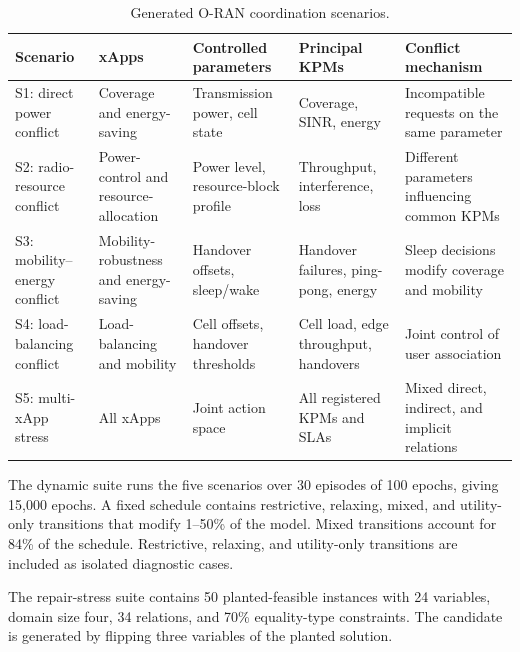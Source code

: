 \documentclass[pdflatex,sn-mathphys-num,iicol,oneside]{sn-jnl}
\begin{document}
\begin{table}[t]
\centering
\caption{Generated O-RAN coordination scenarios.}
\label{tab:scenarios}
\setlength{\tabcolsep}{4pt}
\small

\begin{tabular}{
  >{\raggedright\arraybackslash}p{18mm}
  >{\raggedright\arraybackslash}p{27mm}
  >{\raggedright\arraybackslash}p{32mm}
  >{\raggedright\arraybackslash}p{32mm}
  >{\raggedright\arraybackslash}p{36mm}
}
\toprule
Scenario &
xApps &
Controlled parameters &
Principal KPMs &
Conflict mechanism\\
\midrule

S1: direct power conflict &
Coverage and energy-saving &
Transmission power, cell state &
Coverage, SINR, energy &
Incompatible requests on the same parameter\\

S2: radio-resource conflict &
Power-control and resource-allocation &
Power level, resource-block profile &
Throughput, interference, loss &
Different parameters influencing common KPMs\\

S3: mobility--energy conflict &
Mobility-robustness and energy-saving &
Handover offsets, sleep/wake &
Handover failures, ping-pong, energy &
Sleep decisions modify coverage and mobility\\

S4: load-balancing conflict &
Load-balancing and mobility &
Cell offsets, handover thresholds &
Cell load, edge throughput, handovers &
Joint control of user association\\

S5: multi-xApp stress &
All xApps &
Joint action space &
All registered KPMs and SLAs &
Mixed direct, indirect, and implicit relations\\

\bottomrule
\end{tabular}
\normalsize
\end{table}

The dynamic suite runs the five scenarios over 30 episodes of 100
epochs, giving 15{,}000 epochs. A fixed schedule contains restrictive,
relaxing, mixed, and utility-only transitions that modify 1--50\% of
the model. Mixed transitions account for 84\% of the schedule.
Restrictive, relaxing, and utility-only transitions are included as
isolated diagnostic cases.

The repair-stress suite contains 50 planted-feasible instances with
24 variables, domain size four, 34 relations, and 70\%
equality-type constraints. The candidate is generated by flipping
three variables of the planted solution.
\end{document}
